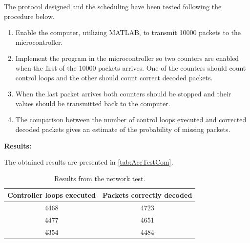 The protocol designed and the scheduling have been tested following the procedure below.
\begin{enumerate}
	\item Enable the computer, utilizing MATLAB, to transmit 10000 packets to the microcontroller.
    \item Implement the program in the microcontroller so two counters are enabled when the first of the 10000 packets arrives. One of the counters should count control loops and the other should count correct decoded packets.
	\item When the last packet arrives both counters should be stopped and their values should be transmitted back to the computer. 
	\item The comparison between the number of control loops executed and corrected decoded packets gives an estimate of the probability of missing packets.
\end{enumerate} 

\textbf{Results:}

The obtained results are presented in \autoref{tab:AccTestCom}.
\begin{table}[]
    \centering
    \begin{tabular}{|c|c|}
        \hline
       Controller loops executed  & Packets correctly decoded \\ \hline
       4468 &  4723\\ \hline
       4477 &  4651\\ \hline
       4354 &  4484\\ \hline
    \end{tabular}
    \caption{Results from the network test.}
        \label{tab:AccTestCom}
\end{table}

